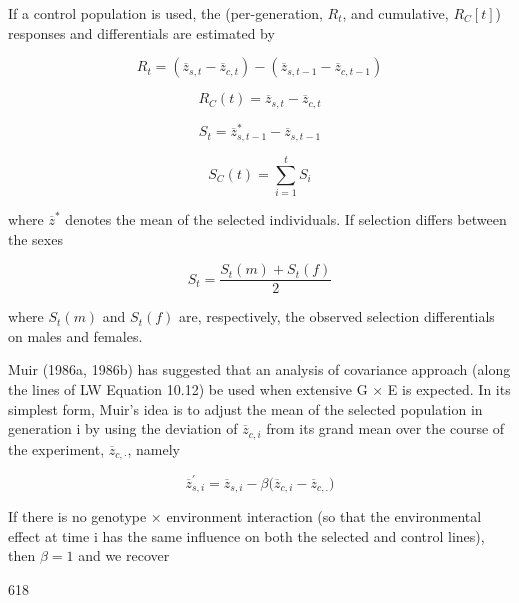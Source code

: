 \documentclass{article}
\begin{document}
If a control population is used, the (per-generation,  $ R_{t} $, and cumulative,  $ R_{C}[t] $) responses and differentials are estimated by

\begin{equation}
R_{t}=\left(\overline{z}_{s,t}-\overline{z}_{c,t}\right)-\left(\overline{z}_{s,t-1}-\overline{z}_{c,t-1}\right)
\tag{18.23a}
\label{eq:18_23a_2}
\end{equation}

\begin{equation}
R_{C}(t)=\overline{z}_{s,t}-\overline{z}_{c,t}
\tag{18.25b}
\label{eq:18_25b}
\end{equation}

\begin{equation}
S_{t}=\overline{z}_{s,t-1}^{*}-\overline{z}_{s,t-1}
\tag{18.25c}
\label{eq:18_25c}
\end{equation}

\begin{equation}
S_{C}(t)=\sum_{i=1}^{t}S_{i}
\tag{18.25d}
\label{eq:18_25d}
\end{equation}

where  $ \overline{z}^{*} $ denotes the mean of the selected individuals. If selection differs between the sexes

\begin{equation}
S_{t}=\frac{S_{t}(m)+S_{t}(f)}{2}
\end{equation}

where  $ S_{t}(m) $ and  $ S_{t}(f) $ are, respectively, the observed selection differentials on males and females.

Muir (1986a, 1986b) has suggested that an analysis of covariance approach (along the lines of LW Equation 10.12) be used when extensive G × E is expected. In its simplest form, Muir's idea is to adjust the mean of the selected population in generation i by using the deviation of  $ \overline{z}_{c,i} $ from its grand mean over the course of the experiment,  $ \overline{z}_{c,\cdot} $, namely

\begin{equation}
\overline{{z}}_{s,i}^{\prime}=\overline{{z}}_{s,i}-\beta\big(\overline{{z}}_{c,i}-\overline{{z}}_{c,.}\big)
\end{equation}

If there is no genotype × environment interaction (so that the environmental effect at time i has the same influence on both the selected and control lines), then  $ \beta = 1 $ and we recover

618
\end{document}
